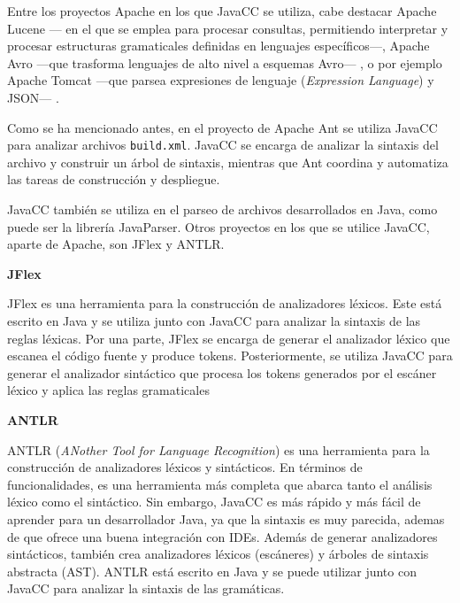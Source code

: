 Entre los proyectos Apache en los que JavaCC se utiliza, cabe destacar Apache Lucene --- en el que se emplea para procesar consultas, permitiendo interpretar y procesar estructuras gramaticales definidas en lenguajes específicos---, Apache Avro ---que trasforma lenguajes de alto nivel a esquemas Avro--- , o por ejemplo Apache Tomcat ---que parsea expresiones de lenguaje (\textit{Expression Language})\cite{expressionlanguage} y JSON--- \cite{javaccgithub}.

Como se ha mencionado antes, en el proyecto de Apache Ant se utiliza JavaCC para analizar archivos \lstinline|build.xml|. JavaCC se encarga de analizar la sintaxis del archivo y construir un árbol de sintaxis, mientras que Ant coordina y automatiza las tareas de construcción y despliegue.

JavaCC también se utiliza en el parseo de archivos desarrollados en Java, como puede ser la librería JavaParser\cite{javaparser}. Otros proyectos en los que se utilice JavaCC, aparte de Apache, son JFlex y ANTLR.

\phantom{text}

\noindent \textbf{JFlex}

\phantom{text}

\noindent JFlex es una herramienta para la construcción de analizadores léxicos. Este está escrito en Java y se utiliza junto con JavaCC para analizar la sintaxis de las reglas léxicas. Por una parte, JFlex se encarga de generar el analizador léxico que escanea el código fuente y produce tokens. Posteriormente, se utiliza JavaCC para generar el analizador sintáctico que procesa los tokens generados por el escáner léxico y aplica las reglas gramaticales

\phantom{text}

\noindent \textbf{ANTLR}

\phantom{text}

\noindent ANTLR (\textit{ANother Tool for Language Recognition}) es una herramienta para la construcción de analizadores léxicos y sintácticos. En términos de funcionalidades, es una herramienta más completa que abarca tanto el análisis léxico como el sintáctico. Sin embargo, JavaCC es más rápido y más fácil de aprender para un desarrollador Java, ya que la sintaxis es muy parecida, ademas de que ofrece una buena integración con IDEs\cite{antlr}. Además de generar analizadores sintácticos, también crea analizadores léxicos (escáneres) y árboles de sintaxis abstracta (AST).
ANTLR está escrito en Java y se puede utilizar junto con JavaCC para analizar la sintaxis de las gramáticas.

